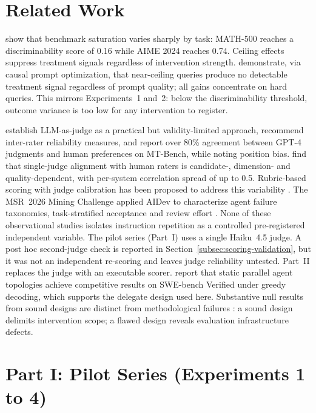 \documentclass[11pt,a4paper]{article}
\begin{document}
\section{Related Work}

\citet{qian2026} show that benchmark saturation varies sharply by task: MATH-500 reaches a discriminability score of 0.16 while AIME 2024 reaches 0.74.
Ceiling effects suppress treatment signals regardless of intervention strength.
\citet{chen2026causal} demonstrate, via causal prompt optimization, that near-ceiling queries produce no detectable treatment signal regardless of prompt quality; all gains concentrate on hard queries.
This mirrors Experiments~1 and~2: below the discriminability threshold, outcome variance is too low for any intervention to register.

\citet{zheng2023} establish LLM-as-judge as a practical but validity-limited approach, recommend inter-rater reliability measures, and report over 80\% agreement between GPT-4 judgments and human preferences on MT-Bench, while noting position bias.
\citet{shen2023} find that single-judge alignment with human raters is candidate-, dimension- and quality-dependent, with per-system correlation spread of up to 0.5.
Rubric-based scoring with judge calibration has been proposed to address this variability \citep{hashemi2024llmrubric}.
The MSR~2026 Mining Challenge applied AIDev to characterize agent failure taxonomies, task-stratified acceptance and review effort \citep{failureMSR2026,comparingMSR2026,revieweffortMSR2026}.
None of these observational studies isolates instruction repetition as a controlled pre-registered independent variable.
The pilot series (Part~I) uses a single Haiku~4.5 judge.
A post hoc second-judge check is reported in Section~\ref{subsec:scoring-validation}, but it was not an independent re-scoring and leaves judge reliability untested.
Part~II replaces the judge with an executable scorer.
\citet{adaptorch2026} report that static parallel agent topologies achieve competitive results on SWE-bench Verified under greedy decoding, which supports the delegate design used here.
Substantive null results from sound designs are distinct from methodological failures \citep{sculley2018}: a sound design delimits intervention scope; a flawed design reveals evaluation infrastructure defects.

\section{Part I: Pilot Series (Experiments 1 to 4)}
\label{sec:partI}
\end{document}
